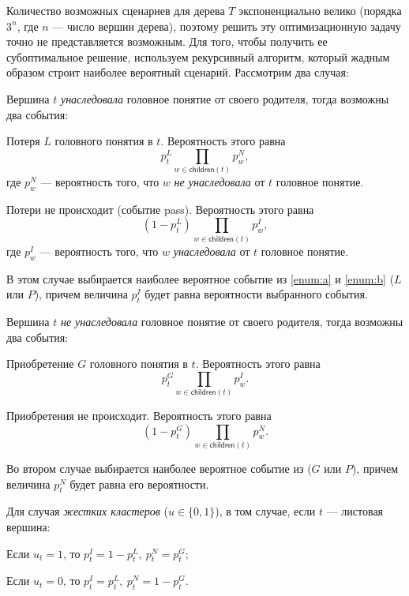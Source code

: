 \documentclass[12pt]{article}
\newenvironment{enumerate*}%
{\begin{enumerate}%
	\setlength{\itemsep}{0pt}%
	\setlength{\parskip}{0pt}}%
{\end{enumerate}}
\newenvironment{alphaenumerate*}
{\begin{enumerate}[label=(\asbuk*), ref=(\asbuk*)]
	\setlength{\itemsep}{0pt}
	\setlength{\parskip}{0pt}}
{\end{enumerate}}
\newcommand{\children}[1] {\textsf{children}(#1)}
\begin{document}
Количество возможных сценариев для дерева $T$ экспоненциально велико (порядка $3^n$, где $n$ --- число вершин дерева), поэтому решить эту оптимизационную задачу точно не представляется возможным. Для того, чтобы получить ее субоптимальное решение, используем рекурсивный алгоритм, который жадным образом строит наиболее вероятный сценарий. Рассмотрим два случая:
\begin{enumerate*}
	\item Вершина $t$ \emph{унаследовала} головное понятие от своего родителя, тогда возможны два события:
	\begin{alphaenumerate*}
		\item\label{enum:a} Потеря $L$ головного понятия в $t$. Вероятность этого равна $$p_t^L\prod_{w\in\children{t}}p_w^N,$$ где $p_w^N$ --- вероятность того, что $w$ \emph{не унаследовала} от $t$ головное понятие.
		\item\label{enum:b} Потери не происходит (событие pass). Вероятность этого равна $$(1-p_t^L)\prod_{w\in\children{t}}p_w^I,$$ где $p_w^I$ --- вероятность того, что $w$ \emph{унаследовала} от $t$ головное понятие.
	\end{alphaenumerate*}
	В этом случае выбирается наиболее вероятное событие из \ref{enum:a} и \ref{enum:b} ($L$ или $P$), причем величина $p_t^I$ будет равна вероятности выбранного события.
	\item Вершина $t$ \emph{не унаследовала} головное понятие от своего родителя, тогда возможны два события:
	\begin{alphaenumerate*}
		\item Приобретение $G$ головного понятия в $t$. Вероятность этого равна $$p_t^G \prod_{w\in\children{t}}p_w^I.$$
		\item Приобретения не происходит. Вероятность этого равна $$(1-p_t^G) \prod_{w\in\children{t}}p_w^N.$$
	\end{alphaenumerate*}
	Во втором случае выбирается наиболее вероятное событие из ($G$ или $P$), причем величина $p_t^N$ будет равна его вероятности.
\end{enumerate*}

Для случая \emph{жестких кластеров} ($u\in\{0, 1\}$), в том случае, если $t$ --- листовая вершина:
\begin{enumerate*}
	\item Если $u_t = 1$, то $p_t^I=1-p_t^L, \ p_t^N=p_t^G$;
	\item Если $u_t = 0$, то $p_t^I=p_t^L, \ p_t^N=1-p_t^G$.
 \end{enumerate*}
\end{document}
